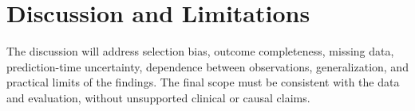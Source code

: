 \section{Discussion and Limitations}
The discussion will address selection bias, outcome completeness, missing
data, prediction-time uncertainty, dependence between observations,
generalization, and practical limits of the findings. The final scope must
be consistent with the data and evaluation, without unsupported clinical
or causal claims.
